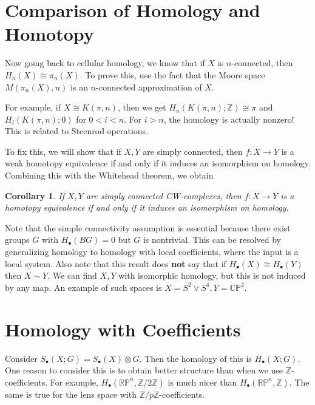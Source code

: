 \documentclass[leqno, openany]{memoir}
\newtheorem{cor}[thm]{Corollary}
\theoremstyle{definition}
\theoremstyle{remark}
\theoremstyle{plain}
\theoremstyle{definition}
\theoremstyle{remark}
\newcommand{\R}{\mathbb{R}}
\newcommand{\C}{\mathbb{C}}
\newcommand{\Z}{\mathbb{Z}}
\renewcommand{\P}{\mathbb{P}}
\begin{document}
\section{Comparison of Homology and Homotopy}%
\label{sec:comparison_of_homology_and_homotopy}

Now going back to cellular homology, we know that if $X$ is $n$-connected, then $H_n(X) \cong \pi_n(X)$. To prove this, use the fact that the Moore space $M(\pi_n(X), n)$ is an $n$-connected approximation of $X$.

For example, if $X \cong K(\pi, n)$, then we get $H_n(K(\pi, n); \Z) \cong \pi$ and $H_i(K(\pi, n); 0)$ for $0 < i < n$. For $i > n$, the homology is actually nonzero! This is related to Steenrod operations.

To fix this, we will show that if $X,Y$ are simply connected, then $f \colon X \to Y$ is a weak homotopy equivalence if and only if it induces an isomorphism on homology. Combining this with the Whitehead theorem, we obtain

\begin{cor}
    If $X,Y$ are simply connected CW-complexes, then $f \colon X \to Y$ is a homotopy equivalence if and only if it induces an isomorphism on homology.
\end{cor}

Note that the simple connectivity assumption is essential because there exist groups $G$ with $H_{\bullet}(BG) = 0$ but $G$ is nontrivial. This can be resolved by generalizing homology to homology with local coefficients, where the input is a local system. Also note that this result does \textbf{not} say that if $H_{\bullet}(X) \cong H_{\bullet}(Y)$ then $X \sim Y$. We can find $X,Y$ with isomorphic homology, but this is not induced by any map. An example of such spaces is $X = S^2 \vee S^4, Y = \C\P^2$.

\section{Homology with Coefficients}%
\label{sec:homology_with_coefficients}

Consider $S_{\bullet}(X;G) = S_{\bullet}(X) \otimes G$. Then the homology of this is $H_{\bullet}(X;G)$. One reason to consider this is to obtain better structure than when we use $\Z$-coefficients. For example, $H_{\bullet}(\R\P^n, \Z/2\Z)$ is much nicer than $H_{\bullet}(\R\P^n, \Z)$. The same is true for the lens space with $\Z/p\Z$-coefficients.
\end{document}
